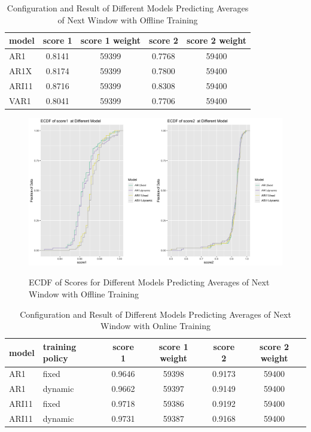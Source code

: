\documentclass{article}
\begin{document}
\begin{table}[htbp]
  \begin{center}
    \caption{Configuration and Result of Different Models Predicting Averages of Next Window with Offline Training}
    \label{tab:tab1.10.1}
    \begin{tabular}{l|*{4}{c}}
      \textbf{model} & \textbf{score 1} & \textbf{score 1 weight} & \textbf{score 2} & \textbf{score 2 weight} \\
      \hline
      AR1 & 0.8141 & 59399 & 0.7768 & 59400\\
      AR1X & 0.8174 & 59399 & 0.7800 & 59400\\
      ARI11 & 0.8716 & 59399 & 0.8308 & 59400\\
      VAR1 & 0.8041 & 59399 & 0.7706 & 59400\\
    \end{tabular}
  \end{center}
\end{table}

\begin{figure}
    \caption{ECDF of Scores for Different Models Predicting Averages of Next Window with Offline Training}
    \centering
    \includegraphics{images/ECDFofscoresatDifferentModelOfAR1,ARI11,fixed,dynamic.png}
    \label{fig:fig1.10.2}
\end{figure}

\begin{table}[htbp]
  \begin{center}
    \caption{Configuration and Result of Different Models Predicting Averages of Next Window with Online Training}
    \label{tab:tab1.10.2}
    \begin{tabular}{l|l|*{4}{c}}
      \textbf{model} & \textbf{training policy} & \textbf{score 1} & \textbf{score 1 weight} & \textbf{score 2} & \textbf{score 2 weight} \\
      \hline
      AR1 & fixed & 0.9646 & 59398 & 0.9173 & 59400\\
      AR1 & dynamic & 0.9662 & 59397 & 0.9149 & 59400\\
      ARI11 & fixed & 0.9718 & 59386 & 0.9192 & 59400\\
      ARI11 & dynamic & 0.9731 & 59387 & 0.9168 & 59400\\
    \end{tabular}
  \end{center}
\end{table}
\end{document}
